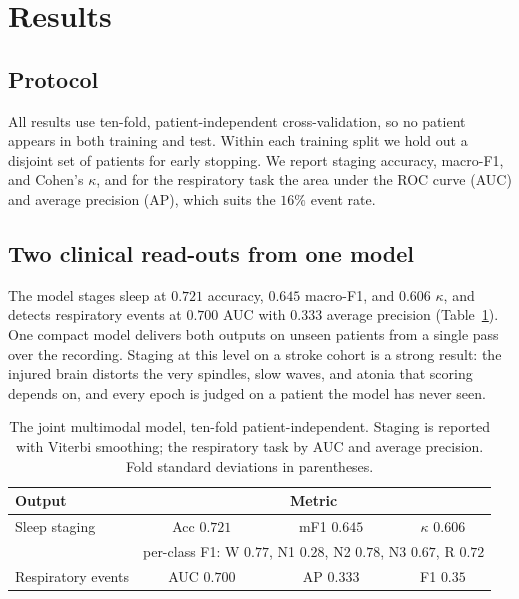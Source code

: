 \documentclass[journal]{IEEEtran}
\newcommand{\mmAcc}{0.721}   %
\newcommand{\mmMf}{0.645}    %
\newcommand{\mmK}{0.606}     %
\newcommand{\mmAuc}{0.700}   %
\newcommand{\mmAp}{0.333}    %
\begin{document}
\section{Results}
\label{sec:results}
\subsection{Protocol}
All results use ten-fold, patient-independent cross-validation, so no patient appears in both
training and test. Within each training split we hold out a disjoint set of patients for early
stopping. We report staging accuracy, macro-F1, and Cohen's $\kappa$, and for the respiratory
task the area under the ROC curve (AUC) and average precision (AP), which suits the $16\%$
event rate.

\subsection{Two clinical read-outs from one model}
The model stages sleep at $\mmAcc$ accuracy, $\mmMf$ macro-F1, and $\mmK$ $\kappa$, and detects
respiratory events at $\mmAuc$ AUC with $\mmAp$ average precision (Table~\ref{tab:main}). One
compact model delivers both outputs on unseen patients from a single pass over the recording.
Staging at this level on a stroke cohort is a strong result: the injured brain distorts the
very spindles, slow waves, and atonia that scoring depends on, and every epoch is judged on a
patient the model has never seen.

\begin{table}[t]
\caption{The joint multimodal model, ten-fold patient-independent. Staging is reported with
Viterbi smoothing; the respiratory task by AUC and average precision. Fold standard deviations
in parentheses.}
\label{tab:main}
\centering
\setlength{\tabcolsep}{4pt}
\begin{tabular}{lccc}
\toprule
Output & \multicolumn{3}{c}{Metric}\\
\midrule
Sleep staging & Acc $\mmAcc$ & mF1 $\mmMf$ & $\kappa$ $\mmK$ \\
              & \multicolumn{3}{c}{\footnotesize per-class F1: W $0.77$, N1 $0.28$, N2 $0.78$, N3 $0.67$, R $0.72$}\\
\midrule
Respiratory events & AUC $\mmAuc$ & AP $\mmAp$ & F1 $0.35$ \\
\bottomrule
\end{tabular}
\end{table}
\end{document}
